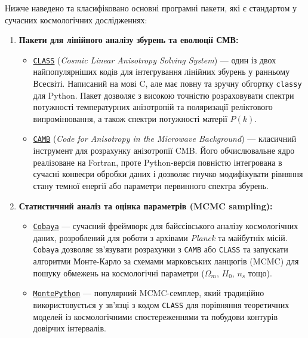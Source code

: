 \documentclass[12pt, a4paper]{article}
\begin{document}
Нижче наведено та класифіковано основні програмні пакети, які є стандартом у сучасних космологічних дослідженнях:

\begin{enumerate}[leftmargin=*]
    \item \textbf{Пакети для лінійного аналізу збурень та еволюції СМВ:}
    \begin{itemize}
        \item \href{http://class-code.net/}{\texttt{CLASS}} (\emph{Cosmic Linear Anisotropy Solving System}) --- один із двох найпопулярніших кодів для інтегрування лінійних збурень у ранньому Всесвіті. Написаний на мові C, але має повну та зручну обгортку \texttt{classy} для Python. Пакет дозволяє з високою точністю розраховувати спектри потужності температурних анізотропій та поляризації реліктового випромінювання, а також спектри потужності матерії $P(k)$.
        \item \href{https://camb.readthedocs.io/}{\texttt{CAMB}} (\emph{Code for Anisotropy in the Microwave Background}) --- класичний інструмент для розрахунку анізотропії CMB. Його обчислювальне ядро реалізоване на Fortran, проте Python-версія повністю інтегрована в сучасні конвеєри обробки даних і дозволяє гнучко модифікувати рівняння стану темної енергії або параметри первинного спектра збурень.
    \end{itemize}

    \item \textbf{Статистичний аналіз та оцінка параметрів (MCMC sampling):}
    \begin{itemize}
        \item \href{https://cobaya.readthedocs.io/}{\texttt{Cobaya}} --- сучасний фреймворк для байєсівського аналізу космологічних даних, розроблений для роботи з архівами \emph{Planck} та майбутніх місій. \texttt{Cobaya} дозволяє зв'язувати розрахунки з \texttt{CAMB} або \texttt{CLASS} та запускати алгоритми Монте-Карло за схемами марковських ланцюгів (MCMC) для пошуку обмежень на космологічні параметри ($\Omega_m$, $H_0$, $n_s$ тощо).
        \item \href{https://github.com/brinckmann/montepython_public}{\texttt{MontePython}} --- популярний MCMC-семплер, який традиційно використовується у зв'язці з кодом \texttt{CLASS} для порівняння теоретичних моделей із космологічними спостереженнями та побудови контурів довірчих інтервалів.
    \end{itemize}


\end{enumerate}
\end{document}
